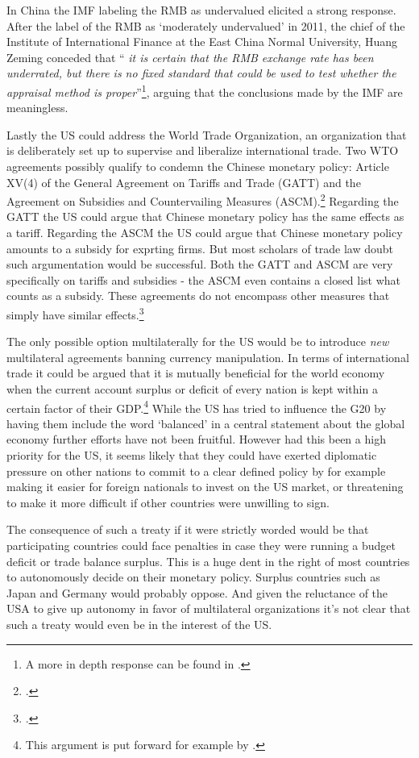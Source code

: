 In China the IMF labeling the RMB as undervalued elicited a strong 
response. After the label of the RMB as `moderately undervalued' in 
2011, the chief of the Institute of International Finance at the East 
China Normal University, Huang Zeming conceded that ``\textit{ it is 
	certain that the RMB exchange rate has been underrated, but there is 
	no fixed standard that could be used to test whether the appraisal 
method is proper}''\footnote{A more in depth response can be found in 
\cite{ChinaDaily11}.}, arguing that the conclusions made by the IMF are 
meaningless.

Lastly the US could address the World Trade Organization, an organization that is deliberately set up to supervise 
and liberalize international trade. Two WTO agreements possibly qualify to condemn the Chinese monetary policy: Article XV(4) of the General Agreement on Tariffs and Trade (GATT) and the Agreement on Subsidies and Countervailing Measures (ASCM).\footnote{\cite[pp. 135]{Waibel2010}.} Regarding the GATT the US could argue that Chinese monetary policy has the same effects as a tariff. Regarding the ASCM the US could argue that Chinese monetary policy amounts to a subsidy for exprting firms. But most scholars of trade law doubt such argumentation would be successful. Both the GATT and ASCM are very specifically on tariffs and subsidies - the ASCM even contains a closed list what counts as a subsidy. These agreements  do not encompass other measures that simply have similar effects.\footnote{\cite{Waibel2010}.}

The only possible option multilaterally for the US would be to introduce \emph{new} multilateral agreements banning currency manipulation. In terms of international trade it could be argued that it is mutually 
beneficial for the world economy when the current account surplus or 
deficit of every nation is kept within a certain factor of their 
GDP.\footnote{This argument is put forward for example by
\cite{cline2009}.} While the US has tried to influence the G20 by having 
them include the word `balanced' in a central statement about the global 
economy further efforts have not been fruitful. However had this been a 
high priority for the US, it seems likely that they could have exerted 
diplomatic pressure on other nations to commit to a clear defined policy 
by for example making it easier for foreign nationals to invest on the 
US market, or threatening to make it more difficult if other countries 
were unwilling to sign.

The consequence of such a treaty if it were strictly worded would be 
that participating countries could face penalties in case they were 
running a budget deficit or trade balance surplus.  This is a huge dent 
in the right of most countries to autonomously decide on their monetary 
policy. Surplus countries such as Japan and Germany would probably oppose. And given the reluctance of the USA to give up autonomy in favor of multilateral organizations it's not clear that such a treaty 
would even be in the interest of the US.

